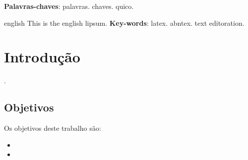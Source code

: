 \documentclass[12pt,openright,oneside,chapter=TITLE,section=TITLE,hidelinks,brazil]{utfpr-pg}
\begin{document}
\frenchspacing

\imprimircapa
\imprimirfolhaderosto

 \begin{resumo}
   \lipsum[23]
   \vspace{\onelineskip}
   \noindent
   \textbf{Palavras-chaves}: palavras. chaves. quico.
 \end{resumo}

 \begin{resumo}[Abstract]
   \begin{otherlanguage*}{english}
     This is the english lipsum. \lipsum[2]
     \vspace{\onelineskip}
     \noindent
     \textbf{Key-words}: latex. abntex. text editoration.
   \end{otherlanguage*}
 \end{resumo}






\tableofcontents*
\cleardoublepage

\textual
\pagestyle{simple}

\chapter{Introdução}
\lipsum[1]
\cite{kwiatkowska_probabilistic_2002}.

\section{Objetivos}
Os objetivos deste trabalho são:
\begin{itemize}
\item \lipsum[2]
\item \lipsum[3]
\end{itemize}
\end{document}
